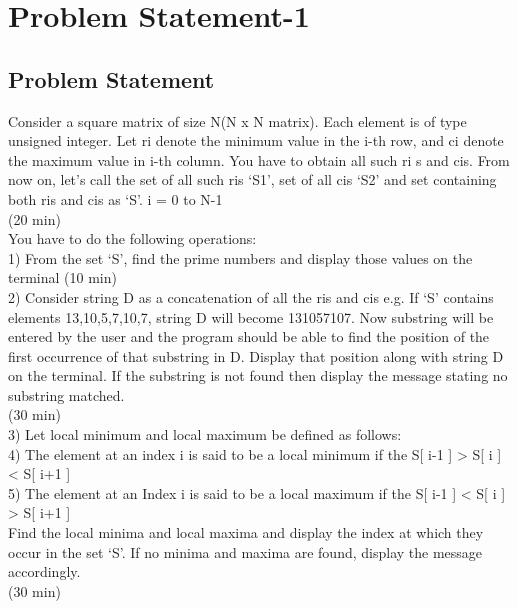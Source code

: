 \documentclass[12pt]{article}
\begin{document}

\newpage
\tableofcontents
\newpage
\listoffigures
\newpage



\section{Problem Statement-1}

\subsection{Problem Statement}
Consider a square matrix of size N(N x N matrix). Each element is of type unsigned integer. Let ri denote the minimum value in the i-th row, and ci denote the maximum value in i-th column. You have to obtain all such ri s and cis. From now on, let's call the set of all such ris ‘S1’, set of all cis ‘S2’ and set containing both ris and cis as ‘S’. i = 0 to N-1                     \\ (20 min) \\
You have to do the following operations:\\
1)  From the set ‘S’, find the prime numbers and display those values on the terminal (10 min)\\
2)  Consider string D as a concatenation of all the ris and cis e.g. If ‘S’ contains elements {13,10,5,7,10,7}, string D will become 131057107. Now substring will be entered by the user and the program should be able to find the position of the first occurrence of that substring in D. Display that position along with string D on the terminal. If the substring is not found then display the message stating no substring matched.\\         (30 min)\\ 
3)  Let local minimum and local maximum be defined as follows:\\
4)  The element at an index i is said to be a local minimum if the S[ i-1 ] > S[ i ] < S[ i+1 ]\\
5)  The element at an Index i is said to be a local maximum if the S[ i-1 ] < S[ i ] > S[ i+1 ]\\
         Find the local minima and local maxima and display the index at which they occur in the set ‘S’. If no minima and maxima are found, display the message accordingly.    \\    (30 min)\\
\end{document}
